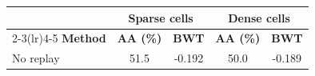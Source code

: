 \begin{tabular}{lcccc}
\toprule
& \multicolumn{2}{c}{\textbf{Sparse cells}} & \multicolumn{2}{c}{\textbf{Dense cells}} \\
\cmidrule(lr){2-3}\cmidrule(lr){4-5}
\textbf{Method} & \textbf{AA (\%)} & \textbf{BWT} & \textbf{AA (\%)} & \textbf{BWT} \\
\midrule
No replay & 51.5 & -0.192 & 50.0 & -0.189 \\
\bottomrule
\end{tabular}
